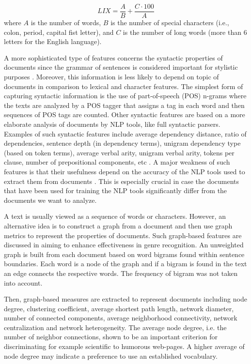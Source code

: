 \begin{equation} \label{chap:relevant_work:eq:LIX}
	LIX = \frac{A}{B} + \frac{C \cdot 100}{A}
\end{equation}
\nointend where $A$ is the number of words, $B$ is the number of special characters (i.e., colon, period, capital fist letter), and $C$ is the number of long words (more than 6 letters for the English language). 

A more sophisticated type of features concerns the syntactic properties of documents since the grammar of sentences is considered important for stylistic purposes . Moreover, this information is less likely to depend on topic of documents in comparison to lexical and character features. The simplest form of capturing syntactic information is the use of part-of-speech (POS) n-grams where the texts are analyzed by a POS tagger that assigns a tag in each word and then sequences of POS tags are counted. Other syntactic features are based on a more elaborate analysis of documents by NLP tools, like full syntactic parsers. Examples of such syntactic features include average dependency distance, ratio of dependencies, sentence depth (in dependency terms), unigram dependency type (based on token terms), average verbal arity, unigram verbal arity, tokens per clause, number of prepositional components, etc . A major weakness of such features is that their usefulness depend on the accuracy of the NLP tools used to extract them from documents . This is especially crucial in case the documents that have been used for training the NLP tools significantly differ from the documents we want to analyze.

A text is usually viewed as a sequence of words or characters. However, an alternative idea is to construct a graph from a document and then use graph metrics to represent the properties of documents. Such graph-based features are discussed in \parencite{nabhan2016graph} aiming to enhance effectiveness in genre recognition. An unweighted graph is built from each document based on word bigrams found within sentence boundaries. Each word is a node of the graph and if a bigram is found in the text an edge connects the respective words. The frequency of bigram was not taken into account. 

Then, graph-based measures are extracted to represent documents including node degree, clustering coefficient, average shortest path length, network diameter, number of connected components, average neighborhood connectivity, network centralization and network heterogeneity.  The average node degree, i.e. the number of neighbor connections, shown  to be an important criterion for discriminating for example scientific to humorous web-pages. A higher average of node degree may indicate a preference to use an established vocabulary.

